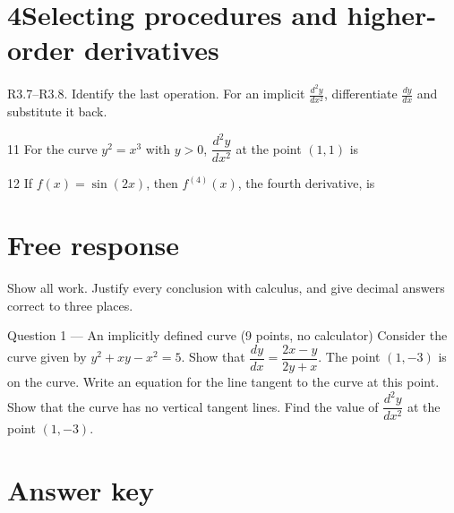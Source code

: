 \documentclass{apcalc}
\begin{document}
\section*{4\quad Selecting procedures and higher-order derivatives}
\begin{setrule}R3.7–R3.8. Identify the last operation. For an implicit $\frac{d^2y}{dx^2}$, differentiate $\frac{dy}{dx}$ and substitute it back.\end{setrule}
\begin{q}{11}
For the curve $y^2=x^3$ with $y>0$, $\dfrac{d^2y}{dx^2}$ at the point $(1,1)$ is
\end{q}
\begin{q}{12}
If $f(x)=\sin(2x)$, then $f^{(4)}(x)$, the fourth derivative, is
\end{q}
\clearpage\section*{Free response}
Show all work. Justify every conclusion with calculus, and give decimal answers correct to three places.
\begin{frq}{Question 1 --- An implicitly defined curve (9 points, no calculator)}
Consider the curve given by $y^2+xy-x^2=5$.
Show that $\dfrac{dy}{dx}=\dfrac{2x-y}{2y+x}$.\workspace{1.6in}
The point $(1,-3)$ is on the curve. Write an equation for the line tangent to the curve at this point.\workspace{1.6in}
Show that the curve has no vertical tangent lines.\workspace{1.6in}
Find the value of $\dfrac{d^2y}{dx^2}$ at the point $(1,-3)$.\workspace{1.6in}
\end{frq}
\clearpage\section*{Answer key}
\vspace{4pt}
\end{document}
